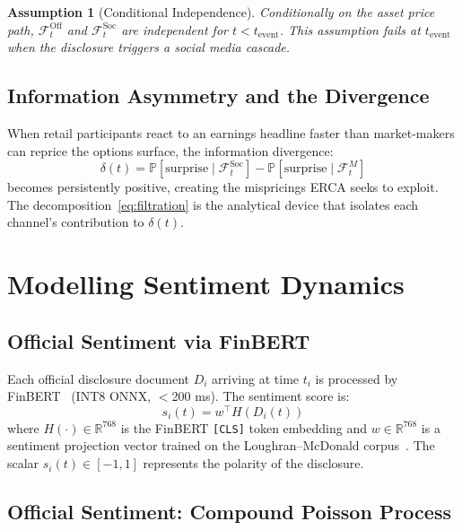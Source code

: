 \documentclass[10pt,twocolumn]{article}
\newtheorem{assumption}{Assumption}[section]
\newcommand{\R}{\mathbb{R}}
\newcommand{\F}{\mathcal{F}}
\newcommand{\Prob}{\mathbb{P}}
\begin{document}
\begin{assumption}[Conditional Independence]
\label{ass:indep}
Conditionally on the asset price path, $\F^{\mathrm{Off}}_t$ and
$\F^{\mathrm{Soc}}_t$ are independent for $t < t_{\mathrm{event}}$. This
assumption fails at $t_{\mathrm{event}}$ when the disclosure triggers a
social media cascade.
\end{assumption}

\subsection{Information Asymmetry and the Divergence}

When retail participants react to an earnings headline faster than
market-makers can reprice the options surface, the information divergence:
\begin{equation}
\delta(t) = \Prob\!\left[\mathrm{surprise}\mid\F^{\mathrm{Soc}}_t\right]
           -\Prob\!\left[\mathrm{surprise}\mid\F^M_t\right]
\end{equation}
becomes persistently positive, creating the mispricings ERCA seeks to exploit.
The decomposition~\eqref{eq:filtration} is the analytical device that isolates
each channel's contribution to $\delta(t)$.

\section{Modelling Sentiment Dynamics}
\label{sec:sentiment}

\subsection{Official Sentiment via FinBERT}

Each official disclosure document $D_i$ arriving at time $t_i$ is processed
by FinBERT~\cite{araci2019} (INT8 ONNX, $<$200 ms). The sentiment score is:
\begin{equation}
\label{eq:finbert}
s_i(t) = w^\top H(D_i(t))
\end{equation}
where $H(\cdot)\in\R^{768}$ is the FinBERT \texttt{[CLS]} token embedding
and $w\in\R^{768}$ is a sentiment projection vector trained on the
Loughran--McDonald corpus~\cite{loughran2011}. The scalar $s_i(t)\in[-1,1]$
represents the polarity of the disclosure.

\subsection{Official Sentiment: Compound Poisson Process}
\end{document}
